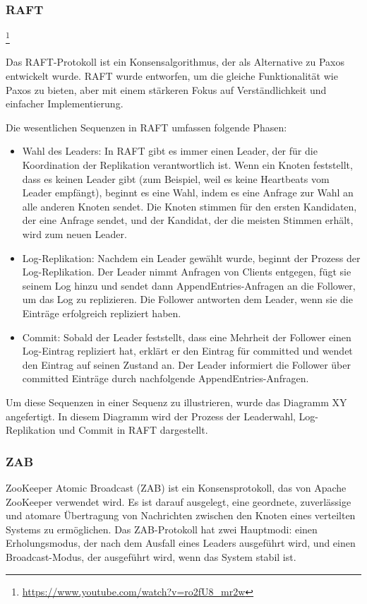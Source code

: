 \subsubsection{RAFT}\footnote{\url{https://www.youtube.com/watch?v=ro2fU8_mr2w}}

Das RAFT-Protokoll ist ein Konsensalgorithmus, der als Alternative zu Paxos entwickelt wurde. RAFT wurde entworfen, um die gleiche Funktionalität wie Paxos zu bieten, aber mit einem stärkeren Fokus auf Verständlichkeit und einfacher Implementierung.

Die wesentlichen Sequenzen in RAFT umfassen folgende Phasen:
\begin{itemize}
\item Wahl des Leaders: In RAFT gibt es immer einen Leader, der für die Koordination der Replikation verantwortlich ist. Wenn ein Knoten feststellt, dass es keinen Leader gibt (zum Beispiel, weil es keine Heartbeats vom Leader empfängt), beginnt es eine Wahl, indem es eine Anfrage zur Wahl an alle anderen Knoten sendet. Die Knoten stimmen für den ersten Kandidaten, der eine Anfrage sendet, und der Kandidat, der die meisten Stimmen erhält, wird zum neuen Leader.
\item Log-Replikation: Nachdem ein Leader gewählt wurde, beginnt der Prozess der Log-Replikation. Der Leader nimmt Anfragen von Clients entgegen, fügt sie seinem Log hinzu und sendet dann AppendEntries-Anfragen an die Follower, um das Log zu replizieren. Die Follower antworten dem Leader, wenn sie die Einträge erfolgreich repliziert haben.
\item Commit: Sobald der Leader feststellt, dass eine Mehrheit der Follower einen Log-Eintrag repliziert hat, erklärt er den Eintrag für committed und wendet den Eintrag auf seinen Zustand an. Der Leader informiert die Follower über committed Einträge durch nachfolgende AppendEntries-Anfragen.
\end{itemize}
Um diese Sequenzen in einer Sequenz zu illustrieren, wurde  das Diagramm XY angefertigt. In diesem Diagramm wird der Prozess der Leaderwahl, Log-Replikation und Commit in RAFT dargestellt.


\subsubsection{ZAB}
ZooKeeper Atomic Broadcast (ZAB) ist ein Konsensprotokoll, das von Apache ZooKeeper verwendet wird. Es ist darauf ausgelegt, eine geordnete, zuverlässige und atomare Übertragung von Nachrichten zwischen den Knoten eines verteilten Systems zu ermöglichen. Das ZAB-Protokoll hat zwei Hauptmodi: einen Erholungsmodus, der nach dem Ausfall eines Leaders ausgeführt wird, und einen Broadcast-Modus, der ausgeführt wird, wenn das System stabil ist.

